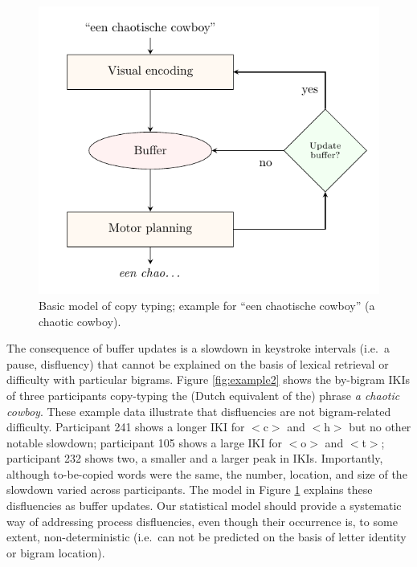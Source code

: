 \documentclass[
  english,
  man,mask,floatsintext]{apa7}
\begin{document}
\begin{figure}[bp!]

{\centering \includegraphics{spelling_decision} 

}

\caption{Basic model of copy typing; example for ``een chaotische cowboy'' (a chaotic cowboy).}\label{fig:model}
\end{figure}

The consequence of buffer updates is a slowdown in keystroke intervals (i.e.~a pause, disfluency) that cannot be explained on the basis of lexical retrieval or difficulty with particular bigrams. Figure \ref{fig:example2} shows the by-bigram IKIs of three participants copy-typing the (Dutch equivalent of the) phrase \emph{a chaotic cowboy}. These example data illustrate that disfluencies are not bigram-related difficulty. Participant 241 shows a longer IKI for \(<\)c\(>\) and \(<\)h\(>\) but no other notable slowdown; participant 105 shows a large IKI for \(<\)o\(>\) and \(<\)t\(>\); participant 232 shows two, a smaller and a larger peak in IKIs. Importantly, although to-be-copied words were the same, the number, location, and size of the slowdown varied across participants. The model in Figure \ref{fig:model} explains these disfluencies as buffer updates. Our statistical model should provide a systematic way of addressing process disfluencies, even though their occurrence is, to some extent, non-deterministic (i.e.~can not be predicted on the basis of letter identity or bigram location).
\end{document}
